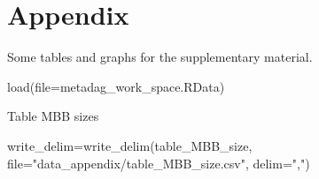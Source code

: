 \documentclass[
  letterpaper,
  DIV=11,
  numbers=noendperiod]{scrreprt}
\newenvironment{Shaded}{}{}
\newcommand{\AttributeTok}[1]{\textcolor[rgb]{0.78,0.47,0.87}{#1}}
\newcommand{\FunctionTok}[1]{\textcolor[rgb]{0.38,0.69,0.94}{#1}}
\newcommand{\NormalTok}[1]{\textcolor[rgb]{0.67,0.70,0.75}{#1}}
\newcommand{\OtherTok}[1]{\textcolor[rgb]{0.15,0.68,0.38}{#1}}
\newcommand{\StringTok}[1]{\textcolor[rgb]{0.60,0.76,0.47}{#1}}
\begin{document}

\chapter{Appendix}\label{appendix}

Some tables and graphs for the supplementary material.

\begin{Shaded}
\begin{Highlighting}[]
\FunctionTok{load}\NormalTok{(}\AttributeTok{file=}\StringTok{\textquotesingle{}metadag\_work\_space.RData\textquotesingle{}}\NormalTok{)}
\end{Highlighting}
\end{Shaded}

Table MBB sizes

\begin{Shaded}
\begin{Highlighting}[]
\NormalTok{write\_delim}\OtherTok{=}\FunctionTok{write\_delim}\NormalTok{(table\_MBB\_size,}
                        \AttributeTok{file=}\StringTok{"data\_appendix/table\_MBB\_size.csv"}\NormalTok{,}
                        \AttributeTok{delim=}\StringTok{","}\NormalTok{)}
\end{Highlighting}
\end{Shaded}
\end{document}

